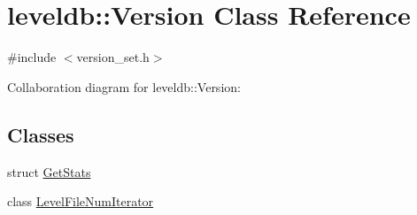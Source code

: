 \hypertarget{classleveldb_1_1_version}{\section{leveldb\-:\-:Version Class Reference}
\label{classleveldb_1_1_version}
}


{\ttfamily \#include $<$version\-\_\-set.\-h$>$}



Collaboration diagram for leveldb\-:\-:Version\-:
\subsection*{Classes}
\begin{DoxyCompactItemize}
\item 
struct \hyperlink{structleveldb_1_1_version_1_1_get_stats}{Get\-Stats}
\item 
class \hyperlink{classleveldb_1_1_version_1_1_level_file_num_iterator}{Level\-File\-Num\-Iterator}
\end{DoxyCompactItemize}
